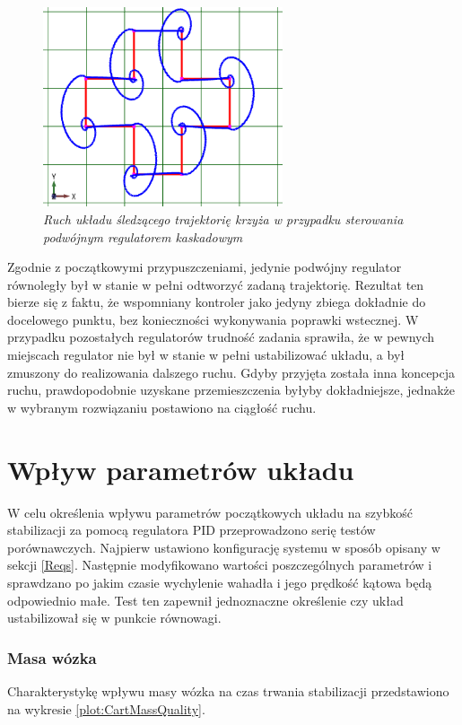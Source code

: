 \documentclass[12pt, twoside, openany]{report}
\theoremstyle{definition}
\begin{document}
\begin{figure}[H]
	\centering
		\includegraphics[width = 200pt]{TrajectoryCrossCascade} 
		\caption{\textit{Ruch układu śledzącego trajektorię krzyża w przypadku sterowania podwójnym regulatorem kaskadowym}}
		\label{TrajectoryCrossCascade}
\end{figure}

Zgodnie z początkowymi przypuszczeniami, jedynie podwójny regulator równoległy był w stanie w pełni odtworzyć zadaną trajektorię. Rezultat ten bierze się z faktu, że wspomniany kontroler jako jedyny zbiega dokładnie do docelowego punktu, bez konieczności wykonywania poprawki wstecznej. W przypadku pozostałych regulatorów trudność zadania sprawiła, że w pewnych miejscach regulator nie był w stanie w pełni ustabilizować układu, a był zmuszony do realizowania dalszego ruchu. Gdyby przyjęta została inna koncepcja ruchu, prawdopodobnie uzyskane przemieszczenia byłyby dokładniejsze, jednakże w wybranym rozwiązaniu postawiono na ciągłość ruchu.


\section{Wpływ parametrów układu}
W celu określenia wpływu parametrów początkowych układu na szybkość stabilizacji za pomocą regulatora PID przeprowadzono serię testów porównawczych. Najpierw ustawiono konfigurację systemu w sposób opisany w sekcji \ref{Reqs}. Następnie modyfikowano wartości poszczególnych parametrów i sprawdzano po jakim czasie wychylenie wahadła i jego prędkość kątowa będą odpowiednio małe. Test ten zapewnił jednoznaczne określenie czy układ ustabilizował się w punkcie równowagi. 

\newpage
\subsubsection{Masa wózka}
Charakterystykę wpływu masy wózka na czas trwania stabilizacji przedstawiono na wykresie \ref{plot:CartMassQuality}.
\end{document}
